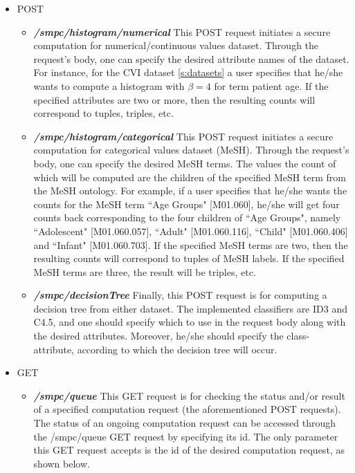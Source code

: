 \begin{itemize}
  \item POST
  \begin{itemize}[label=$\circ$]

    \item \textbf{\textit{/smpc/histogram/numerical}}
    This POST request initiates a secure computation for numerical/continuous values dataset.
    Through the request's body, one can specify the desired attribute names of the dataset.
    For instance, for the CVI dataset \ref{s:datasets} a user specifies that he/she wants to compute a histogram with $\beta = 4$ for term patient age.
    If the specified attributes are two or more, then the resulting counts will correspond to tuples, triples, etc.


    \item \textbf{\textit{/smpc/histogram/categorical}}
    This POST request initiates a secure computation for categorical values dataset (MeSH).
    Through the request's body, one can specify the desired MeSH terms.
    The values the count of which will be computed are the children of the specified MeSH term from the MeSH ontology.
    For example, if a user specifies that he/she wants the counts for the MeSH term ``Age Groups" [M01.060], he/she will get four counts back corresponding to the four children of ``Age Groups", namely ``Adolescent" [M01.060.057], ``Adult" [M01.060.116], ``Child" [M01.060.406] and ``Infant" [M01.060.703].
    If the specified MeSH terms are two, then the resulting counts will correspond to tuples of MeSH labels.
    If the specified MeSH terms are three, the result will be triples, etc.


    \item \textbf{\textit{/smpc/decisionTree}}
    Finally, this POST request is for computing a decision tree from either dataset.
    The implemented classifiers are ID3 and C4.5, and one should specify which to use in the request body along with the desired attributes.
    Moreover, he/she should specify the class-attribute, according to which the decision tree will occur.

  \end{itemize}

  \item GET
  \begin{itemize}[label=$\circ$]
    \item \textbf{\textit{/smpc/queue}}
    This GET request is for checking the status and/or result of a specified computation request (the aforementioned POST requests).
    The status of an ongoing computation request can be accessed through the /smpc/queue GET request by specifying its id.
    The only parameter this GET request accepts is the id of the desired computation request, as shown below.

  \end{itemize}
\end{itemize}

